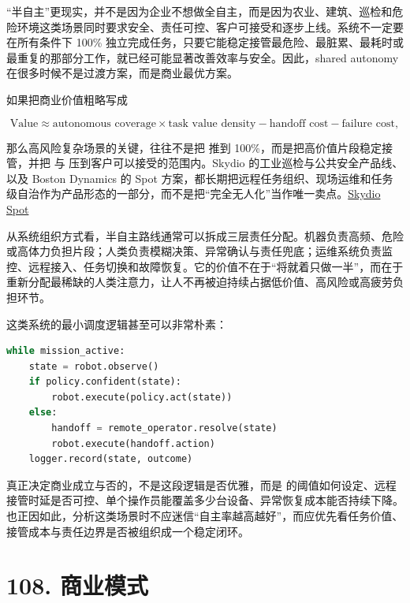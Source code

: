 “半自主”更现实，并不是因为企业不想做全自主，而是因为农业、建筑、巡检和危险环境这类场景同时要求安全、责任可控、客户可接受和逐步上线。系统不一定要在所有条件下 100\% 独立完成任务，只要它能稳定接管最危险、最脏累、最耗时或最重复的那部分工作，就已经可能显著改善效率与安全。因此，shared autonomy 在很多时候不是过渡方案，而是商业最优方案。

如果把商业价值粗略写成

\begingroup
\scriptsize
\begin{equation*}
\text{Value} \approx
\text{autonomous coverage} \times \text{task value density}
- \text{handoff cost}
- \text{failure cost},
\end{equation*}
\endgroup

那么高风险复杂场景的关键，往往不是把 \texttt{} 推到 100\%，而是把高价值片段稳定接管，并把 \texttt{} 与 \texttt{} 压到客户可以接受的范围内。Skydio 的工业巡检与公共安全产品线、以及 Boston Dynamics 的 Spot 方案，都长期把远程任务组织、现场运维和任务级自治作为产品形态的一部分，而不是把“完全无人化”当作唯一卖点。\href{https://www.skydio.com/}{Skydio} \href{https://bostondynamics.com/spot/}{Spot}

从系统组织方式看，半自主路线通常可以拆成三层责任分配。机器负责高频、危险或高体力负担片段；人类负责模糊决策、异常确认与责任兜底；运维系统负责监控、远程接入、任务切换和故障恢复。它的价值不在于“将就着只做一半”，而在于重新分配最稀缺的人类注意力，让人不再被迫持续占据低价值、高风险或高疲劳负担环节。

这类系统的最小调度逻辑甚至可以非常朴素：

\begin{lstlisting}[language=python]
while mission_active:
    state = robot.observe()
    if policy.confident(state):
        robot.execute(policy.act(state))
    else:
        handoff = remote_operator.resolve(state)
        robot.execute(handoff.action)
    logger.record(state, outcome)
\end{lstlisting}

真正决定商业成立与否的，不是这段逻辑是否优雅，而是 \texttt{} 的阈值如何设定、远程接管时延是否可控、单个操作员能覆盖多少台设备、异常恢复成本能否持续下降。也正因如此，分析这类场景时不应迷信“自主率越高越好”，而应优先看任务价值、接管成本与责任边界是否被组织成一个稳定闭环。

\section*{108. 商业模式}

